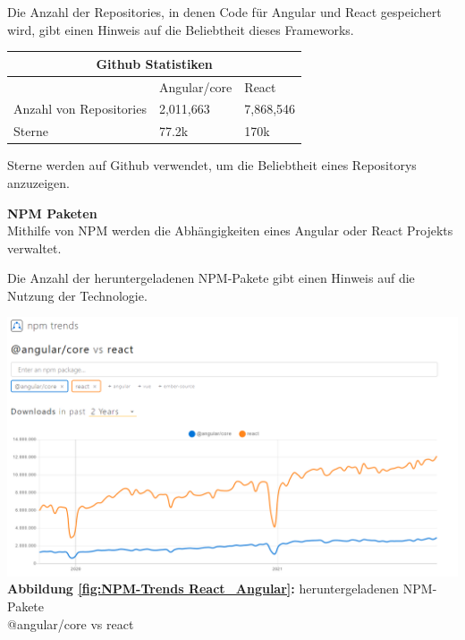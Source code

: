Die Anzahl der Repositories, in denen Code für Angular und React gespeichert wird, gibt einen Hinweis auf die Beliebtheit dieses Frameworks.
\\
\begin{table}[b]
  \centering
  \begin{tabular}{ |p{5cm}||p{3.6cm}|p{3.6cm}|  }
    \hline
    \multicolumn{3}{|c|}{Github Statistiken}\\
    \hline
    & Angular/core & React\\
    \hline
    Anzahl von Repositories & 2,011,663& 7,868,546
    \\
    \hline
    Sterne & 77.2k & 170k
    \\
    \hline
  \end{tabular}
\end{table}
{\cite{GH04, GH06}}
\begin{flushleft}
  Sterne werden auf Github verwendet, um die Beliebtheit eines Repositorys anzuzeigen.

  \newpage
  \textbf{NPM Paketen}\\
  Mithilfe von NPM werden die Abhängigkeiten eines Angular oder React Projekts verwaltet.

  Die Anzahl der heruntergeladenen NPM-Pakete gibt einen Hinweis auf die Nutzung der Technologie.
\end{flushleft}

\begin{center}
  \includegraphics[scale=0.4]
  {sources/NPM-Trends React_Angular}\label{fig:NPM-Trends React_Angular}\\
  \textbf{Abbildung \autoref{fig:NPM-Trends React_Angular}:} heruntergeladenen NPM-Pakete \\@angular/core vs react
    {\cite{NPM01}}
\end{center}

